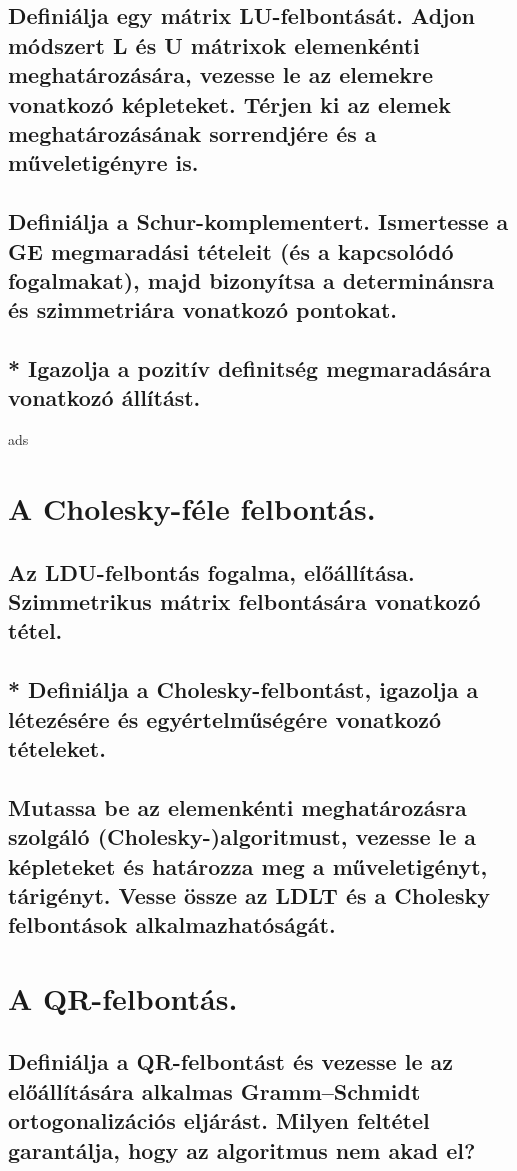 \documentclass{article}
\begin{document}
        \subsection{Definiálja egy mátrix LU-felbontását. Adjon módszert L és U mátrixok elemenkénti meghatározására, vezesse le az elemekre vonatkozó képleteket. Térjen ki az elemek meghatározásának sorrendjére és a műveletigényre is.}
        \subsection{Definiálja a Schur-komplementert. Ismertesse a GE megmaradási tételeit (és a kapcsolódó fogalmakat), majd bizonyítsa a determinánsra és szimmetriára vonatkozó pontokat.}
        \subsection{* Igazolja a pozitív definitség megmaradására vonatkozó állítást.}
    
ads
    \section{A Cholesky-féle felbontás.}
        \subsection{Az LDU-felbontás fogalma, előállítása. Szimmetrikus mátrix felbontására vonatkozó tétel.}
        \subsection{* Definiálja a Cholesky-felbontást, igazolja a létezésére és egyértelműségére vonatkozó tételeket.}
        \subsection{Mutassa be az elemenkénti meghatározásra szolgáló (Cholesky-)algoritmust, vezesse le a képleteket és határozza meg a műveletigényt, tárigényt. Vesse össze az LDLT és a Cholesky felbontások alkalmazhatóságát.}


    \section{A QR-felbontás.}
        \subsection{Definiálja a QR-felbontást és vezesse le az előállítására alkalmas Gramm–Schmidt ortogonalizációs eljárást. Milyen feltétel garantálja, hogy az algoritmus nem akad el?}
\end{document}
